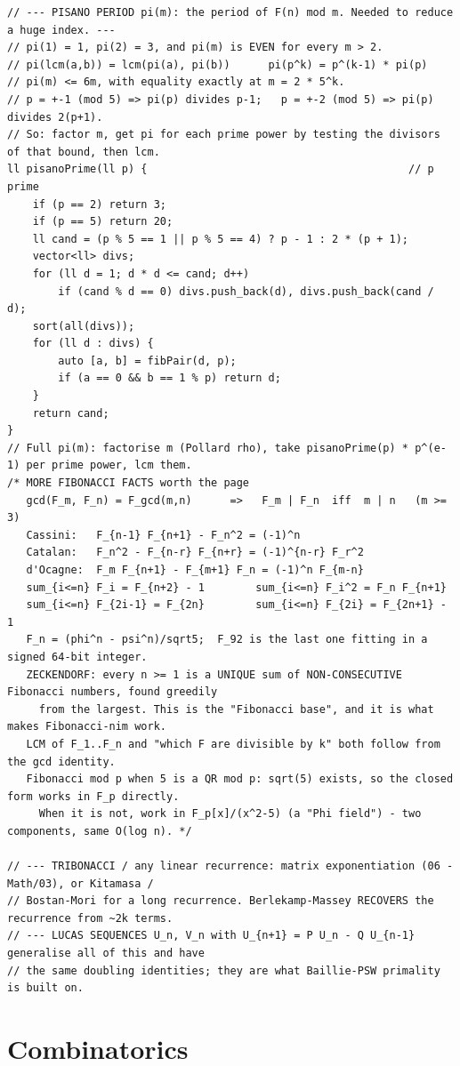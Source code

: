 \documentclass[9pt,a4paper,twocolumn]{extarticle}
\begin{document}
\begin{lstlisting}
// --- PISANO PERIOD pi(m): the period of F(n) mod m. Needed to reduce a huge index. ---
// pi(1) = 1, pi(2) = 3, and pi(m) is EVEN for every m > 2.
// pi(lcm(a,b)) = lcm(pi(a), pi(b))      pi(p^k) = p^(k-1) * pi(p)
// pi(m) <= 6m, with equality exactly at m = 2 * 5^k.
// p = +-1 (mod 5) => pi(p) divides p-1;   p = +-2 (mod 5) => pi(p) divides 2(p+1).
// So: factor m, get pi for each prime power by testing the divisors of that bound, then lcm.
ll pisanoPrime(ll p) {                                         // p prime
    if (p == 2) return 3;
    if (p == 5) return 20;
    ll cand = (p % 5 == 1 || p % 5 == 4) ? p - 1 : 2 * (p + 1);
    vector<ll> divs;
    for (ll d = 1; d * d <= cand; d++)
        if (cand % d == 0) divs.push_back(d), divs.push_back(cand / d);
    sort(all(divs));
    for (ll d : divs) {
        auto [a, b] = fibPair(d, p);
        if (a == 0 && b == 1 % p) return d;
    }
    return cand;
}
// Full pi(m): factorise m (Pollard rho), take pisanoPrime(p) * p^(e-1) per prime power, lcm them.
/* MORE FIBONACCI FACTS worth the page
   gcd(F_m, F_n) = F_gcd(m,n)      =>   F_m | F_n  iff  m | n   (m >= 3)
   Cassini:   F_{n-1} F_{n+1} - F_n^2 = (-1)^n
   Catalan:   F_n^2 - F_{n-r} F_{n+r} = (-1)^{n-r} F_r^2
   d'Ocagne:  F_m F_{n+1} - F_{m+1} F_n = (-1)^n F_{m-n}
   sum_{i<=n} F_i = F_{n+2} - 1        sum_{i<=n} F_i^2 = F_n F_{n+1}
   sum_{i<=n} F_{2i-1} = F_{2n}        sum_{i<=n} F_{2i} = F_{2n+1} - 1
   F_n = (phi^n - psi^n)/sqrt5;  F_92 is the last one fitting in a signed 64-bit integer.
   ZECKENDORF: every n >= 1 is a UNIQUE sum of NON-CONSECUTIVE Fibonacci numbers, found greedily
     from the largest. This is the "Fibonacci base", and it is what makes Fibonacci-nim work.
   LCM of F_1..F_n and "which F are divisible by k" both follow from the gcd identity.
   Fibonacci mod p when 5 is a QR mod p: sqrt(5) exists, so the closed form works in F_p directly.
     When it is not, work in F_p[x]/(x^2-5) (a "Phi field") - two components, same O(log n). */

// --- TRIBONACCI / any linear recurrence: matrix exponentiation (06 - Math/03), or Kitamasa /
// Bostan-Mori for a long recurrence. Berlekamp-Massey RECOVERS the recurrence from ~2k terms.
// --- LUCAS SEQUENCES U_n, V_n with U_{n+1} = P U_n - Q U_{n-1} generalise all of this and have
// the same doubling identities; they are what Baillie-PSW primality is built on.
\end{lstlisting}

\section{Combinatorics}
\end{document}
